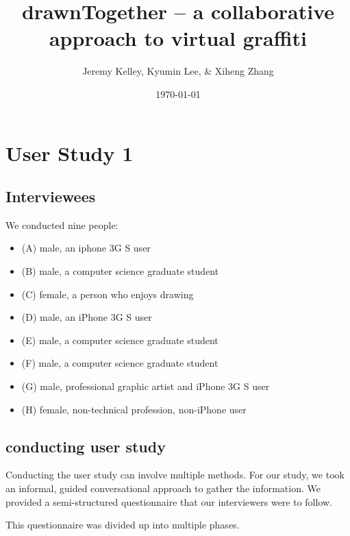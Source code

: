 \documentclass{www2010-submission}
\begin{document}
\setlength{\parindent}{0pt}
\setlength{\parskip}{.5ex plus 0.5ex minus 0.2ex}




\title{ drawnTogether -- a collaborative approach to virtual graffiti }

\author{ Jeremy Kelley, Kyumin Lee, \& Xiheng Zhang }

\date{\today}

\maketitle

\section{ User Study 1 }
\subsection{Interviewees}
We conducted nine people:

\begin{itemize}
\item (A) male, an iphone 3G S user
\item (B) male, a computer science graduate student
\item (C) female, a person who enjoys drawing
\item (D) male, an iPhone 3G S user
\item (E) male, a computer science graduate student
\item (F) male, a computer science graduate student
\item (G) male, professional graphic artist and iPhone 3G S user
\item (H) female, non-technical profession, non-iPhone user
\end{itemize}

\subsection{conducting user study}

Conducting the user study can involve multiple methods.  For our study, we took
an informal, guided conversational approach to gather the information.  We
provided a semi-structured questionnaire that our interviewers were to follow.

This questionnaire was divided up into multiple phases.
\end{document}
